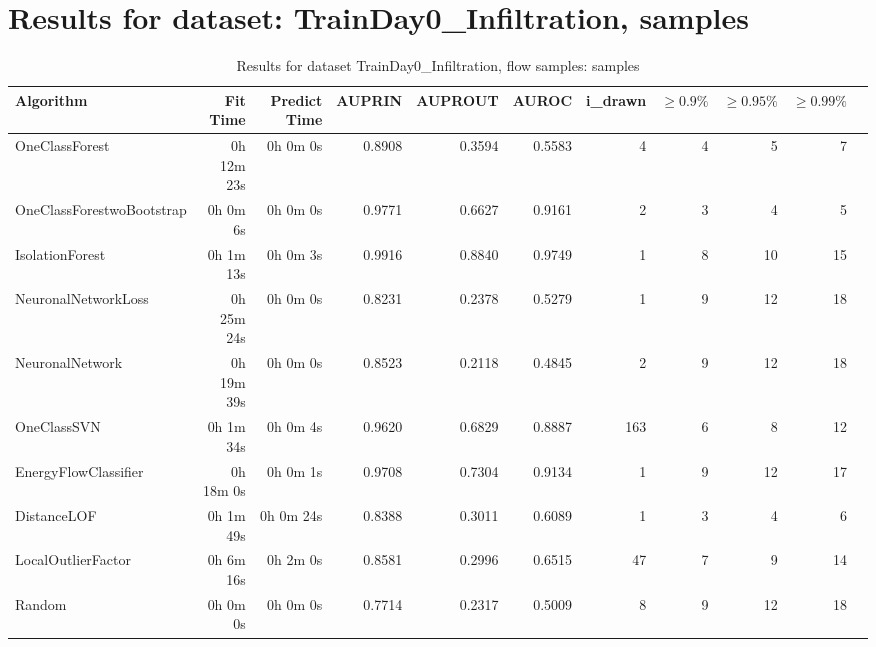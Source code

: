 \documentclass{article}
\begin{document}
\section*{Results for dataset: TrainDay0_Infiltration, samples}
\begin{table}[h!]
\centering
\caption{Results for dataset TrainDay0_Infiltration, flow samples: samples}
\begin{tabular}{lrrrrrrrrrr}
\toprule
Algorithm & Fit Time & Predict Time & AUPRIN & AUPROUT & AUROC & i\_drawn & $\geq 0.9\%$ & $\geq 0.95\%$ & $\geq 0.99\%$ \\
\midrule
OneClassForest & 0h 12m 23s & 0h 0m 0s & 0.8908 & 0.3594 & 0.5583 & 4 & 4 & 5 & 7 \\
OneClassForestwoBootstrap & 0h 0m 6s & 0h 0m 0s & 0.9771 & 0.6627 & 0.9161 & 2 & 3 & 4 & 5 \\
IsolationForest & 0h 1m 13s & 0h 0m 3s & 0.9916 & 0.8840 & 0.9749 & 1 & 8 & 10 & 15 \\
NeuronalNetworkLoss & 0h 25m 24s & 0h 0m 0s & 0.8231 & 0.2378 & 0.5279 & 1 & 9 & 12 & 18 \\
NeuronalNetwork & 0h 19m 39s & 0h 0m 0s & 0.8523 & 0.2118 & 0.4845 & 2 & 9 & 12 & 18 \\
OneClassSVN & 0h 1m 34s & 0h 0m 4s & 0.9620 & 0.6829 & 0.8887 & 163 & 6 & 8 & 12 \\
EnergyFlowClassifier & 0h 18m 0s & 0h 0m 1s & 0.9708 & 0.7304 & 0.9134 & 1 & 9 & 12 & 17 \\
DistanceLOF & 0h 1m 49s & 0h 0m 24s & 0.8388 & 0.3011 & 0.6089 & 1 & 3 & 4 & 6 \\
LocalOutlierFactor & 0h 6m 16s & 0h 2m 0s & 0.8581 & 0.2996 & 0.6515 & 47 & 7 & 9 & 14 \\
Random & 0h 0m 0s & 0h 0m 0s & 0.7714 & 0.2317 & 0.5009 & 8 & 9 & 12 & 18 \\
\bottomrule
\end{tabular}
\end{table}
\end{document}
